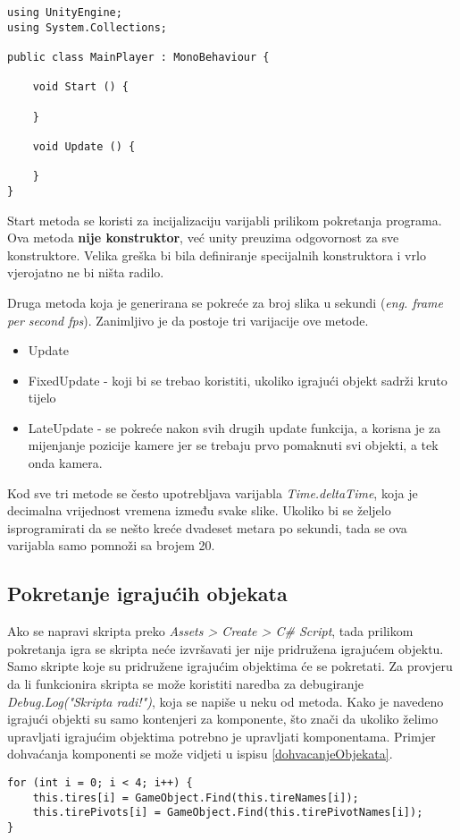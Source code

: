 \begin{lstlisting}[caption={Primjer skripte}, label=primjerSkripte]
using UnityEngine;
using System.Collections;

public class MainPlayer : MonoBehaviour {

    void Start () {
    
    }
    
    void Update () {
    
    }
}
\end{lstlisting}
Start metoda se koristi za incijalizaciju varijabli prilikom pokretanja programa. Ova metoda \textbf{nije konstruktor}, već unity preuzima odgovornost za sve konstruktore. Velika greška bi bila definiranje specijalnih konstruktora i vrlo vjerojatno ne bi ništa radilo. \par
Druga metoda koja je generirana se pokreće za broj slika u sekundi (\emph{eng. frame per second fps}). Zanimljivo je da postoje tri varijacije ove metode.
\begin{itemize} 
	\item Update
	\item FixedUpdate - koji bi se trebao koristiti, ukoliko igrajući objekt sadrži kruto tijelo
	\item LateUpdate - se pokreće nakon svih drugih update funkcija, a korisna je za mijenjanje pozicije kamere jer se trebaju prvo pomaknuti svi objekti, a tek onda kamera. 
\end{itemize}
Kod sve tri metode se često upotrebljava varijabla \textit{Time.deltaTime}, koja je decimalna vrijednost vremena između svake slike. Ukoliko bi se željelo isprogramirati da se nešto kreće dvadeset metara po sekundi, tada se ova varijabla samo pomnoži sa brojem 20.
\subsection{Pokretanje igrajućih objekata}
Ako se napravi skripta preko \emph{Assets > Create > C\# Script}, tada prilikom pokretanja igra se skripta neće izvršavati jer nije pridružena igrajućem objektu. Samo skripte koje su pridružene igrajućim objektima će se pokretati. Za provjeru da li funkcionira skripta se može koristiti naredba za debugiranje \emph{Debug.Log("Skripta radi!")}, koja se napiše u neku od metoda. Kako je navedeno igrajući objekti su samo kontenjeri za komponente, što znači da ukoliko želimo upravljati igrajućim objektima potrebno je upravljati komponentama. Primjer dohvaćanja komponenti se može vidjeti u ispisu \ref{dohvacanjeObjekata}. 
\begin{lstlisting}[caption={Dohvaćanje objekata}, label=dohvacanjeObjekata]
for (int i = 0; i < 4; i++) {
	this.tires[i] = GameObject.Find(this.tireNames[i]);
	this.tirePivots[i] = GameObject.Find(this.tirePivotNames[i]);
}
\end{lstlisting}

